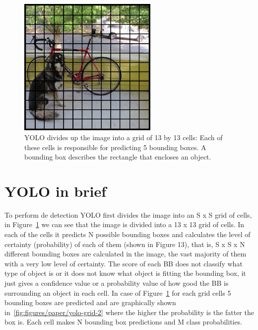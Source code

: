 \begin{sloppypar}
\begin{figure}[H] %
  \centering
  \includegraphics[width=0.60\textwidth]{figures/paper/yolo-grid.png}
  \caption[YOLO divides up the image into a grid of 13 by 13 cells]{YOLO divides up the image into a grid of 13 by 13 cells: Each of these cells is responsible for predicting 5 bounding boxes. A bounding box describes the rectangle that encloses an object.}
  \label{fig:figures/paper/yolo-grid}
\end{figure}


\end{sloppypar}



\section{YOLO in brief}
  To perform de detection YOLO first divides the image into an S x S grid of cells, in Figure~\ref{fig:figures/paper/yolo-grid} we
  can  see  that  the  image  is divided  into  a  13 x  13  grid  of  cells.  In  each of the cells  it  predicts  N
  possible  bounding  boxes  and  calculates  the  level  of  certainty  (probability)  of  each  of  them
  (shown in Figure 13), that is, S x S x N different bounding boxes are calculated in the image, the
  vast majority of them with a very low level of certainty. The score of each BB does not classify
  what type of object is or it does not know what object is fitting the bounding box, it just gives a
  confidence value or a probability value of how good the BB is surrounding an object in each cell.
  In case of Figure~\ref{fig:figures/paper/yolo-grid} for each grid cells 5 bounding boxes are predicted and are graphically shown
  in~\ref{fig:figures/paper/yolo-grid-2} where the higher the probability is the fatter the box is. Each cell makes N bounding
  box predictions and M class probabilities.


